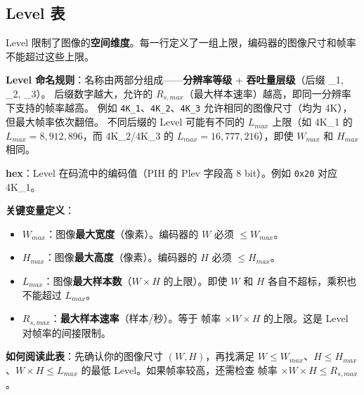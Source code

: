 \subsection{Level 表}

Level 限制了图像的\textbf{空间维度}。每一行定义了一组上限，编码器的图像尺寸和帧率不能超过这些上限。

\medskip
\textbf{Level 命名规则}：名称由两部分组成——\textbf{分辨率等级} + \textbf{吞吐量层级}（后缀 \_1, \_2, \_3）。
后缀数字越大，允许的 $R_{s,max}$（最大样本速率）越高，即同一分辨率下支持的帧率越高。
例如 \texttt{4K\_1}、\texttt{4K\_2}、\texttt{4K\_3} 允许相同的图像尺寸（均为 4K），但最大帧率依次翻倍。
不同后缀的 Level 可能有不同的 $L_{max}$ 上限（如 4K\_1 的 $L_{max} = 8{,}912{,}896$，而 4K\_2/4K\_3 的 $L_{max} = 16{,}777{,}216$），即使 $W_{max}$ 和 $H_{max}$ 相同。

\medskip
\textbf{hex}：Level 在码流中的编码值（PIH 的 Plev 字段高 8 bit）。例如 \texttt{0x20} 对应 4K\_1。

\medskip
\textbf{关键变量定义}：
\begin{itemize}
  \item $W_{max}$：图像\textbf{最大宽度}（像素）。编码器的 $W$ 必须 $\leq W_{max}$。
  \item $H_{max}$：图像\textbf{最大高度}（像素）。编码器的 $H$ 必须 $\leq H_{max}$。
  \item $L_{max}$：图像\textbf{最大样本数}（$W \times H$ 的上限）。即使 $W$ 和 $H$ 各自不超标，乘积也不能超过 $L_{max}$。
  \item $R_{s,max}$：\textbf{最大样本速率}（样本/秒）。等于 帧率 $\times W \times H$ 的上限。这是 Level 对帧率的间接限制。
\end{itemize}

\textbf{如何阅读此表}：先确认你的图像尺寸 $(W, H)$，再找满足 $W \leq W_{max}$、$H \leq H_{max}$、$W \times H \leq L_{max}$ 的最低 Level。如果帧率较高，还需检查 帧率 $\times W \times H \leq R_{s,max}$。

